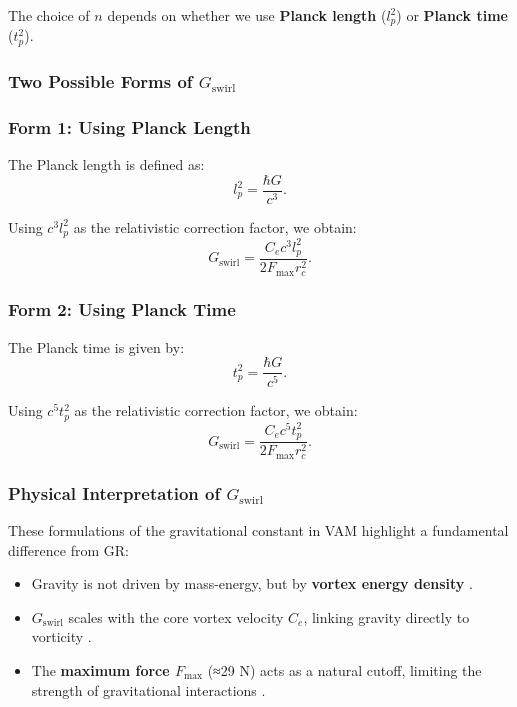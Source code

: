 The choice of \( n \) depends on whether we use \textbf{Planck length} (\( l_p^2 \)) or \textbf{Planck time} (\( t_p^2 \)).

\subsubsection*{Two Possible Forms of \(  G_\text{swirl} \)}
\subsubsection*{Form 1: Using Planck Length}
The Planck length is defined as:
\begin{equation*}
    l_p^2 = \frac{\hbar G}{c^3}.
\end{equation*}

Using \( c^3 l_p^2 \) as the relativistic correction factor, we obtain:
\begin{equation*}
    G_\text{swirl} = \frac{C_e c^3 l_p^2}{2 F_{\max} r_c^2}.
\end{equation*}

\subsubsection*{Form 2: Using Planck Time}
The Planck time is given by:
\begin{equation*}
    t_p^2 = \frac{\hbar G}{c^5}.
\end{equation*}

Using \( c^5 t_p^2 \) as the relativistic correction factor, we obtain:
\begin{equation*}
    G_\text{swirl} = \frac{C_e c^5 t_p^2}{2 F_{\max} r_c^2}.
\end{equation*}

\subsubsection*{Physical Interpretation of \(  G_\text{swirl} \)}
These formulations of the gravitational constant in VAM highlight a fundamental difference from GR:
\begin{itemize}
    \item Gravity is not driven by mass-energy, but by \textbf{vortex energy density} \cite{barcelo_superfluid}.
    \item \(  G_\text{swirl} \) scales with the core vortex velocity \( C_e \), linking gravity directly to vorticity \cite{moffatt_helicity}.
    \item The \textbf{maximum force \( F_{\max} \)} (≈29 N) acts as a natural cutoff, limiting the strength of gravitational interactions \cite{schiller_max_force}.
\end{itemize}

